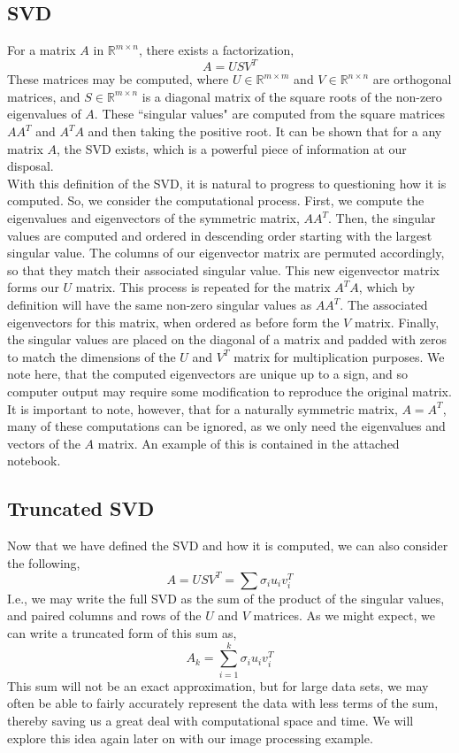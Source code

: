 \documentclass[letterpaper,12pt]{article}
\newcommand{\R}{\mathbb{R}}
\begin{document}
\subsection{SVD}
For a matrix $A$ in $\R^{m\times n}$, there exists a factorization,
\[A=USV^T\]
These matrices may be computed, where $U\in \R^{m\times m}$ and $V\in \R^{n\times n}$ are orthogonal matrices, and $S\in \R^{m\times n}$ is a diagonal matrix of the square roots of the non-zero eigenvalues of $A$. These ``singular values" are computed from the square matrices $AA^T$ and $A^TA$ and then taking the positive root. It can be shown that for a any matrix $A$, the SVD exists, which is a powerful piece of information at our disposal.\cite{Extra}\\
With this definition of the SVD, it is natural to progress to questioning how it is computed. So, we consider the computational process. First, we compute the eigenvalues and eigenvectors of the symmetric matrix, $AA^T$. Then, the singular values are computed and ordered in descending order starting with the largest singular value. The columns of our eigenvector matrix are permuted accordingly, so that they match their associated singular value. This new eigenvector matrix forms our $U$ matrix. This process is repeated for the matrix $A^TA$, which by definition will have the same non-zero singular values as $AA^T$. The associated eigenvectors for this matrix, when ordered as before form the $V$ matrix. Finally, the singular values are placed on the diagonal of a matrix and padded with zeros to match the dimensions of the $U$ and $V^T$ matrix for multiplication purposes. We note here, that the computed eigenvectors are unique up to a sign, and so computer output may require some modification to reproduce the original matrix.\cite{SVDHowTo}\\
It is important to note, however, that for a naturally symmetric matrix, $A=A^T$, many of these computations can be ignored, as we only need the eigenvalues and vectors of the $A$ matrix. An example of this is contained in the attached notebook.
\subsection{Truncated SVD}
Now that we have defined the SVD and how it is computed, we can also consider the following,
\[A=USV^T=\sum\sigma_iu_iv^T_i\]
I.e., we may write the full SVD as the sum of the product of the singular values, and paired columns and rows of the $U$ and $V$ matrices. As we might expect, we can write a truncated form of this sum as,
\[A_k = \sum_{i=1}^k\sigma_iu_iv^T_i\]
This sum will not be an exact approximation, but for large data sets, we may often be able to fairly accurately represent the data with less terms of the sum, thereby saving us a great deal with computational space and time. We will explore this idea again later on with our image processing example.\cite{Extra}
\end{document}
